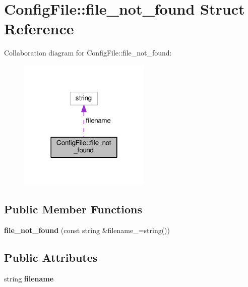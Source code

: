\hypertarget{struct_config_file_1_1file__not__found}{}\section{Config\+File\+:\+:file\+\_\+not\+\_\+found Struct Reference}
\label{struct_config_file_1_1file__not__found}


Collaboration diagram for Config\+File\+:\+:file\+\_\+not\+\_\+found\+:\nopagebreak
\begin{figure}[H]
\begin{center}
\leavevmode
\includegraphics[width=178pt]{struct_config_file_1_1file__not__found__coll__graph}
\end{center}
\end{figure}
\subsection*{Public Member Functions}
\begin{DoxyCompactItemize}
\item 
\mbox{\label{struct_config_file_1_1file__not__found_ab0fa2b6e7d1891136f82d4baf124725b}} 
{\bfseries file\+\_\+not\+\_\+found} (const string \&filename\+\_\+=string())
\end{DoxyCompactItemize}
\subsection*{Public Attributes}
\begin{DoxyCompactItemize}
\item 
\mbox{\label{struct_config_file_1_1file__not__found_a25e11d11b1a9b0f4ca663b21816c2a9a}} 
string {\bfseries filename}
\end{DoxyCompactItemize}



